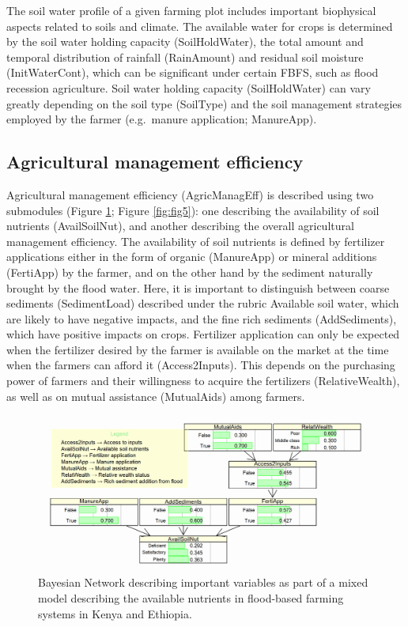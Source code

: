 \documentclass[]{elsarticle} %
\begin{document}
The soil water profile of a given farming plot includes important biophysical aspects related to soils and climate. The available water for crops is determined by the soil water holding capacity (SoilHoldWater), the total amount and temporal distribution of rainfall (RainAmount) and residual soil moisture (InitWaterCont), which can be significant under certain FBFS, such as flood recession agriculture. Soil water holding capacity (SoilHoldWater) can vary greatly depending on the soil type (SoilType) and the soil management strategies employed by the farmer (e.g.~manure application; ManureApp).

\hypertarget{refs13}{%
\subsection{Agricultural management efficiency}\label{refs13}}

Agricultural management efficiency (AgricManagEff) is described using two submodules (Figure \ref{fig:fig4}; Figure \ref{fig:fig5}): one describing the availability of soil nutrients (AvailSoilNut), and another describing the overall agricultural management efficiency. The availability of soil nutrients is defined by fertilizer applications either in the form of organic (ManureApp) or mineral additions (FertiApp) by the farmer, and on the other hand by the sediment naturally brought by the flood water. Here, it is important to distinguish between coarse sediments (SedimentLoad) described under the rubric Available soil water, which are likely to have negative impacts, and the fine rich sediments (AddSediments), which have positive impacts on crops. Fertilizer application can only be expected when the fertilizer desired by the farmer is available on the market at the time when the farmers can afford it (Access2Inputs). This depends on the purchasing power of farmers and their willingness to acquire the fertilizers (RelativeWealth), as well as on mutual assistance (MutualAids) among farmers.

\begin{figure}[!h]

{\centering \includegraphics[width=1\linewidth,]{figures/figure_s4} 

}

\caption{Bayesian Network describing important variables as part of a mixed model describing the available nutrients in flood-based farming systems in Kenya and Ethiopia.}\label{fig:fig4}
\end{figure}
\end{document}
